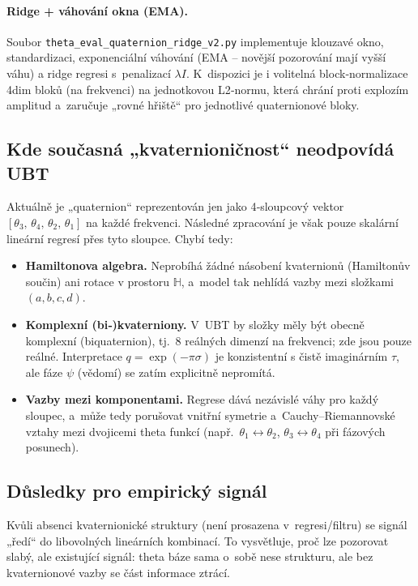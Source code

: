 \documentclass{article}
\begin{document}
\paragraph{Ridge + váhování okna (EMA).}
Soubor \texttt{theta\_eval\_quaternion\_ridge\_v2.py} implementuje klouzavé okno, standardizaci, exponenciální váhování (EMA – novější pozorování mají vyšší váhu) a ridge regresi s penalizací $\lambda I$. K dispozici je i volitelná block‑normalizace 4dim bloků (na frekvenci) na jednotkovou L2‑normu, která chrání proti explozím amplitud a zaručuje „rovné hřiště“ pro jednotlivé quaternionové bloky.

\subsection*{Kde současná „kvaternioničnost“ neodpovídá UBT}

Aktuálně je „quaternion“ reprezentován jen jako 4‑sloupcový vektor $[\theta_3,\,\theta_4,\,\theta_2,\,\theta_1]$ na každé frekvenci. Následné zpracování je však pouze skalární lineární regresí přes tyto sloupce. Chybí tedy:

\begin{itemize}
  \item \textbf{Hamiltonova algebra.} Neprobíhá žádné násobení kvaternionů (Hamiltonův součin) ani rotace v prostoru $\mathbb{H}$, a model tak nehlídá vazby mezi složkami $(a,b,c,d)$.
  \item \textbf{Komplexní (bi‑)kvaterniony.} V UBT by složky měly být obecně komplexní (biquaternion), tj. 8 reálných dimenzí na frekvenci; zde jsou pouze reálné. Interpretace $q = \exp(-\pi\sigma)$ je konzistentní s čistě imaginárním $\tau$, ale fáze $\psi$ (vědomí) se zatím explicitně nepromítá.
  \item \textbf{Vazby mezi komponentami.} Regrese dává nezávislé váhy pro každý sloupec, a může tedy porušovat vnitřní symetrie a Cauchy–Riemannovské vztahy mezi dvojicemi theta funkcí (např. $\theta_1\leftrightarrow \theta_2$, $\theta_3\leftrightarrow \theta_4$ při fázových posunech).
\end{itemize}

\subsection*{Důsledky pro empirický signál}

Kvůli absenci kvaternionické struktury (není prosazena v regresi/filtru) se signál „ředí“ do libovolných lineárních kombinací. To vysvětluje, proč lze pozorovat slabý, ale existující signál: theta báze sama o sobě nese strukturu, ale bez kvaternionové vazby se část informace ztrácí.
\end{document}
